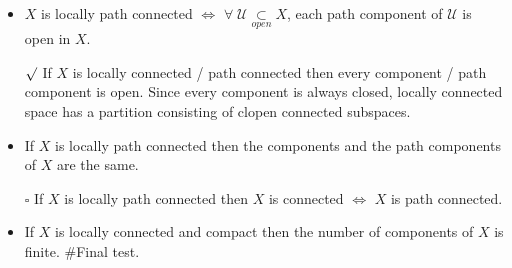 \documentclass[12pt]{article}
\newcommand{\sq}{$\square$}
\newcommand{\rmk}{$\surd$}
\newcommand{\U}{\mathcal{U}}
\newcommand{\open}{\underset{open}{\subset}}
\begin{document}
\begin{itemize}
	\item $X$ is locally path connected $\Leftrightarrow$ $\forall\; \U \open X$, each path component of $\U$ is open in $X$.
	\item[\rmk] If $X$ is locally connected / path connected then every component / path component is open. Since every component is always closed, locally connected space has a partition consisting of clopen connected subspaces.
	\item If $X$ is locally path connected then the components and the path components of $X$ are the same.
	\item[\sq] If $X$ is locally path connected then $X$ is connected $\Leftrightarrow$ $X$ is path connected.
	\item If $X$ is locally connected and compact then the number of components of $X$ is finite. \#Final test. 
\end{itemize}
\bigskip
\end{document}
